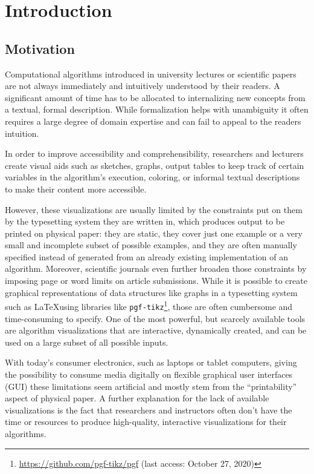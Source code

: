 \section{Introduction}

\subsection{Motivation}

Computational algorithms introduced in university lectures or scientific papers are not always immediately and intuitively understood by their readers.
A significant amount of time has to be allocated to internalizing new concepts from a textual, formal description. While formalization helps with unambiguity it often requires a large degree of domain expertise and can fail to appeal to the readers intuition.

In order to improve accessibility and comprehensibility, researchers and lecturers create visual aids such as sketches, graphs, output tables to keep track of certain variables in the algorithm's execution, coloring, or informal textual descriptions to make their content more accessible. 

However, these visualizations are usually limited by the constraints put on them by the typesetting system they are written in, which produces output to be printed on physical paper: they are static, they cover just one example or a very small and incomplete subset of possible examples, and they are often manually specified instead of generated from an already existing implementation of an algorithm. Moreover, scientific journals even further broaden those constraints by imposing page or word limits on article submissions. While it is possible to create graphical representations of data structures like graphs in a typesetting system such as \LaTeX using libraries like \texttt{pgf-tikz}\footnote{\url{https://github.com/pgf-tikz/pgf} (last access: October 27, 2020)}, those are often cumbersome and time-consuming to specify.
One of the most powerful, but scarcely available tools are algorithm visualizations that are interactive, dynamically created, and can be used on a large subset of all possible inputs. 



With today's consumer electronics, such as laptops or tablet computers, giving the possibility to consume media digitally on flexible graphical user interfaces (GUI) these limitations seem artificial and mostly stem from the ``printability'' aspect of physical paper. A further explanation for the lack of available visualizations is the fact that researchers and instructors often don't have the time or resources to produce high-quality, interactive visualizations for their algorithms.

